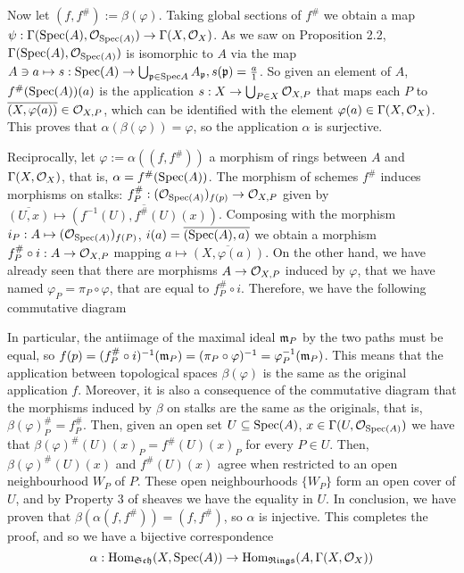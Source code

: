 \begin{sol}
	Now let $(f, f^{\#}):= \beta(\varphi)$. Taking global sections of $f^{\#}$ we obtain a map $\psi: \Gamma(\mathrm{Spec}(A), \mathcal{O}_{\mathrm{Spec}(A)}) \to \Gamma(X, \mathcal{O}_X)$. As we saw on Proposition 2.2, $\Gamma(\mathrm{Spec}(A), \mathcal{O}_{\mathrm{Spec}(A)})$ is isomorphic to $A$ via the map $A \ni a \mapsto s: \mathrm{Spec}(A) \to \bigcup_{\mathfrak{p} \in \mathrm{Spec}{A}} A_{\mathfrak{p}}, s(\mathfrak{p}) = \frac{a}{1}$. So given an element of $A$, $f^{\#}(\mathrm{Spec}(A))(a)$ is the application $s: X \to \bigcup_{P \in X} \mathcal{O}_{X,P}$ that maps each $P$ to $\overline{(X, \varphi(a))} \in \mathcal{O}_{X,P}$, which can be identified with the element $\varphi(a) \in \Gamma(X, \mathcal{O}_X)$. This proves that $\alpha(\beta(\varphi)) = \varphi$, so the application $\alpha$ is surjective.

	Reciprocally, let $\varphi:= \alpha((f, f^{\#}))$ a morphism of rings between $A$ and $\Gamma(X, \mathcal{O}_X)$, that is, $\alpha = f^{\#}(\mathrm{Spec}(A))$. The morphism of schemes $f^{\#}$ induces morphisms on stalks: $f^{\#}_P: (\mathcal{O}_{\mathrm{Spec}(A)})_{f(p)} \to \mathcal{O}_{X,P}$ given by $\overline{(U,x)} \mapsto \overline{(f^{-1}(U), f^{\#}(U)(x))}$. Composing with the morphism $i_P: A \mapsto (\mathcal{O}_{\mathrm{Spec}(A)})_{f(P)}$, $i(a) = \overline{(\mathrm{Spec}(A), a)}$ we obtain a morphism $f^{\#}_P \circ i: A \to \mathcal{O}_{X,P}$ mapping $a \mapsto \overline{(X, \varphi(a))}$. On the other hand, we have already seen that there are morphisms $A \to \mathcal{O}_{X,P}$ induced by $\varphi$, that we have named $\varphi_P = \pi_P \circ \varphi$, that are equal to $f^{\#}_P \circ i$. Therefore, we have the following commutative diagram

	In particular, the antiimage of the maximal ideal $\mathfrak{m}_P$ by the two paths must be equal, so $f(p) = (f^{\#}_P \circ i)^{-1}(\mathfrak{m}_P) = (\pi_P \circ \varphi)^{-1} = \varphi_P^{-1}(\mathfrak{m}_P)$. This means that the application between topological spaces $\beta(\varphi)$ is the same as the original application $f$. Moreover, it is also a consequence of the commutative diagram that the morphisms induced by $\beta$ on stalks are the same as the originals, that is, $\beta(\varphi)^{\#}_P = f^{\#}_P$. Then, given an open set $U \subseteq \mathrm{Spec}(A)$, $x \in \Gamma(U, \mathcal{O}_{\mathrm{Spec}(A)})$ we have that $\beta(\varphi)^{\#}(U)(x)_P = f^{\#}(U)(x)_P$ for every $P \in U$. Then, $\beta(\varphi)^{\#}(U)(x)$ and $f^{\#}(U)(x)$ agree when restricted to an open neighbourhood $W_P$ of $P$. These open neighbourhoods $\{W_P\}$ form an open cover of $U$, and by Property 3 of sheaves we have the equality in $U$. In conclusion, we have proven that $\beta(\alpha(f,f^{\#})) = (f,f^{\#})$, so $\alpha$ is injective. This completes the proof, and so we have a bijective correspondence 
	\[
		\alpha: \mathrm{Hom}_{\mathfrak{Sch}}(X, \mathrm{Spec}(A)) \to \mathrm{Hom}_{\mathfrak{Rings}}(A,\Gamma(X, \mathcal{O}_X))
	\]
\end{sol}

